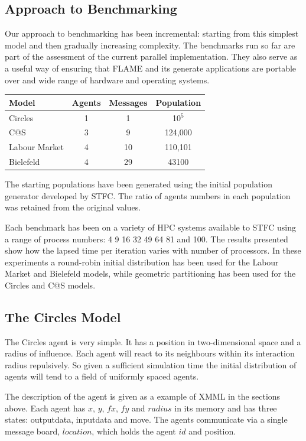\subsection{Approach to Benchmarking}
Our approach to benchmarking has been incremental: starting from this simplest model and then gradually increasing complexity. The benchmarks run so far are part of the assessment of the current parallel implementation. They also serve as a useful way of ensuring that FLAME and its generate applications are portable over and wide range of hardware and operating systems. 

\begin{table}[ht]
 \centering
  \begin{tabular}{l|ccc}
  Model     & Agents & Messages & Population   \\\hline
  Circles     &   1    &   1      &  10$^5$    \\
  C@S       &   3    &   9      &  124,000 \\
  Labour Market &   4    &   10     &  110,101 \\ 
  Bielefeld     &   4    &   29     &  43100     \\\hline
  \end{tabular}
\end{table}

The starting populations have been generated using the initial population generator developed by STFC. The ratio of agents numbers in each population was retained from the original values.

Each benchmark has been on a variety of HPC systems available to STFC using a range of process numbers: 4 9 16 32 49 64 81 and 100. The results presented show how the lapsed time per iteration varies with number of processors. In these experiments a round-robin initial distribution has been used for the Labour Market and Bielefeld models, while geometric partitioning has been used for the Circles and C@S models.

\subsection{The Circles Model}
The Circles agent is very simple. It has a position in two-dimensional space and a radius of influence. Each agent will react to its neighbours within its interaction radius repulsively. So given a sufficient simulation time the initial distribution of agents will tend to a field of uniformly spaced agents.

The description of the agent is given as a example of XMML in the sections above. Each agent has $x$, $y$, $fx$, $fy$ and $radius$ in its memory and has three states: outputdata, inputdata and move. The agents communicate via a single message board, $location$, which holds the agent $id$ and position.

